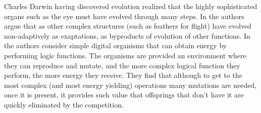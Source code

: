 \documentclass[10pt,a4paper]{article}
\begin{document}
	Charles Darwin having discovered evolution \cite{darwin} realized that the highly  sophisticated organs such as the eye must have evolved through many steps. In \cite{latent} the authors argue that as other complex structures (such as feathers for flight) have evolved non-adaptively as exaptations, as byproducts of evolution of other functions. In \cite{complexfeatures} the authors consider simple digital organisms that can obtain energy by performing logic functions. The organisms are provided an environment where they can reproduce and mutate, and the more complex logical function they perform, the more energy they receive. They find that although to get to the most complex (and most energy yielding) operations many mutations are needed, once it is present, it provides such value that offsprings that don't have it are quickly eliminated by the competition. 
	
	
	
	
\end{document}

